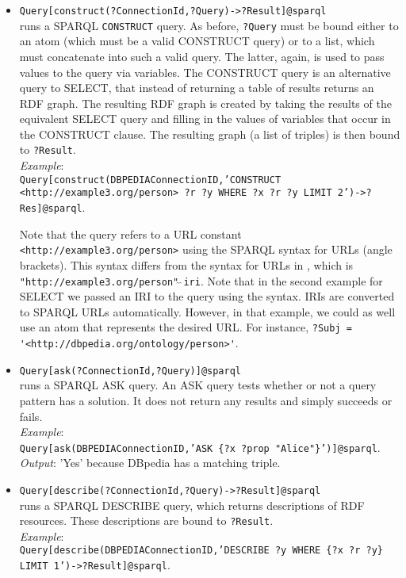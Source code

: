 \begin{itemize}
\item \texttt{Query[construct(?ConnectionId,?Query)->?Result]@\bs{}sparql}
  \\
  runs a 
  SPARQL \texttt{CONSTRUCT}  query.
  As before, \texttt{?Query} must be bound either to an atom (which must be
  a valid CONSTRUCT query) or to a list, which must concatenate into such a
  valid query. The latter, again, is used to pass values to the query via
  variables. 
  The CONSTRUCT query is an alternative
  query to SELECT, that instead of returning a table of results
  returns an RDF graph. The resulting RDF graph is created by taking
  the results of the equivalent SELECT query and filling in the values of
  variables that occur in the CONSTRUCT clause.
  The resulting graph (a list of triples) is then bound to \texttt{?Result}. 
  \\
  \emph{Example}: \\
  \texttt{Query[construct(DBPEDIAConnectionID,'CONSTRUCT
    {<http://example3.org/person> ?r ?y} WHERE {?x ?r ?y}  LIMIT
    2')->?Res]@\bs{}sparql}.

  Note that the query refers to a URL constant
  \texttt{<http://example3.org/person>}  using the SPARQL syntax for
  URLs (angle brackets). This syntax differs from the syntax for URLs in
  \ERGO, which is
  \texttt{"http://example3.org/person"$\hat{~}\hat{~}$\bs{}iri}. Note that
  in the second example for SELECT we passed an IRI to the query using
  the \ERGO syntax. \ERGO IRIs are converted to SPARQL URLs automatically.
  However, in that example, we could as well use an atom that represents
  the desired URL. For instance,
  \verb|?Subj = '<http://dbpedia.org/ontology/person>'|.

\item \texttt{Query[ask(?ConnectionId,?Query)]@\bs{}sparql}\\
  runs a SPARQL ASK query.
 An ASK query tests whether or not a query pattern has a solution.
 It does not return any results and simply succeeds or fails.
  \\
  \emph{Example}: \\
  \texttt{Query[ask(DBPEDIAConnectionID,'ASK \{?x ?prop  "Alice"\}')]@\bs{}sparql}.\\
  \emph{Output}: 'Yes' because DBpedia has a matching triple.
  
\item \texttt{Query[describe(?ConnectionId,?Query)->?Result]@\bs{}sparql}
  \\
  runs a SPARQL DESCRIBE query, which returns descriptions of
  RDF resources. These descriptions are bound to \texttt{?Result}. 
  \\
  \emph{Example}: \\
  \texttt{Query[describe(DBPEDIAConnectionID,'DESCRIBE ?y WHERE \{?x ?r ?y\} LIMIT 1')->?Result]@\bs{}sparql}.


\end{itemize}
